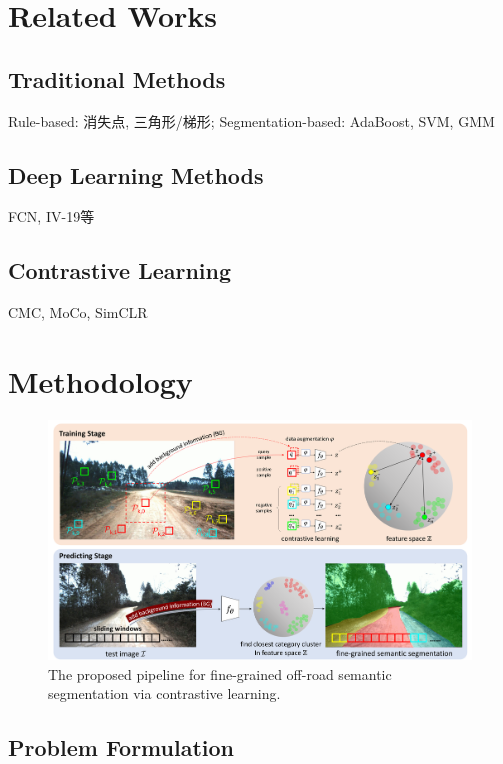 \documentclass[letterpaper, 10 pt, conference]{ieeeconf}  %
\begin{document}
\section{Related Works} \label{related_works}
\subsection{Traditional Methods}
Rule-based: 消失点, 三角形/梯形;
Segmentation-based: AdaBoost, SVM, GMM

\subsection{Deep Learning Methods}
FCN, IV-19等

\subsection{Contrastive Learning}
CMC, MoCo, SimCLR

\section{Methodology} \label{methodology}
\begin{figure}[]
	\centering
	\includegraphics[scale=0.24]{pipeline.pdf}
	\caption{The proposed pipeline for fine-grained off-road semantic segmentation via contrastive learning.}
	\label{fig:pipeline}
\end{figure}
\subsection{Problem Formulation}
\end{document}
